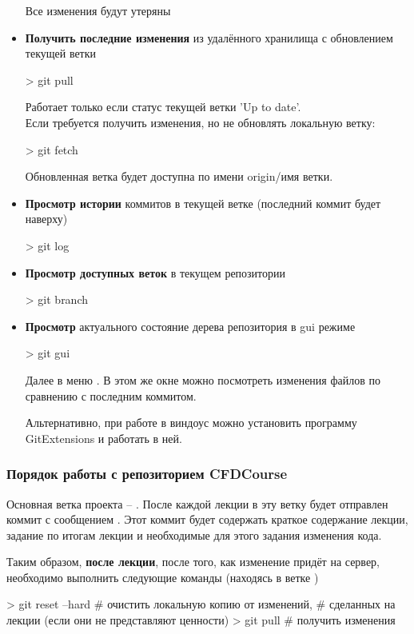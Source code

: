 \begin{itemize}
  Все изменения будут утеряны
\item
  {\bf Получить последние изменения} из удалённого хранилища с обновлением текущей ветки
  \begin{shelloutput}
> git pull
  \end{shelloutput}
  Работает только если статус текущей ветки 'Up to date'.\\
  Если требуется получить изменения, но не обновлять локальную ветку:
  \begin{shelloutput}
> git fetch
  \end{shelloutput}
  Обновленная ветка будет доступна по имени origin/{имя ветки}.
\item
  {\bf Просмотр истории} коммитов в текущей ветке (последний коммит будет наверху)
  \begin{shelloutput}
> git log
  \end{shelloutput}
\item
  {\bf Просмотр доступных веток} в текущем репозитории
  \begin{shelloutput}
> git branch
  \end{shelloutput}
\item
  {\bf Просмотр} актуального состояние дерева репозитория в gui режиме
  \begin{shelloutput}
> git gui
  \end{shelloutput}
  Далее в меню .
  В этом же окне можно посмотреть изменения файлов по сравнению с последним коммитом.

  Альтернативно, при работе в виндоус можно установить программу GitExtensions и работать в ней.
\end{itemize}
  
\subsubsection{Порядок работы с репозиторием CFDCourse}

Основная ветка проекта -- . После каждой лекции в эту ветку будет отправлен коммит с сообщением .
Этот коммит будет содержать краткое содержание лекции,
задание по итогам лекции и необходимые для этого задания изменения кода.

Таким образом, {\bf после лекции}, после того, как изменение  придёт на сервер, необходимо выполнить следующие команды (находясь в ветке )
\begin{shelloutput}
> git reset --hard  # очистить локальную копию от изменений,
                    # сделанных на лекции (если они не представляют ценности)
> git pull          # получить изменения
\end{shelloutput}

